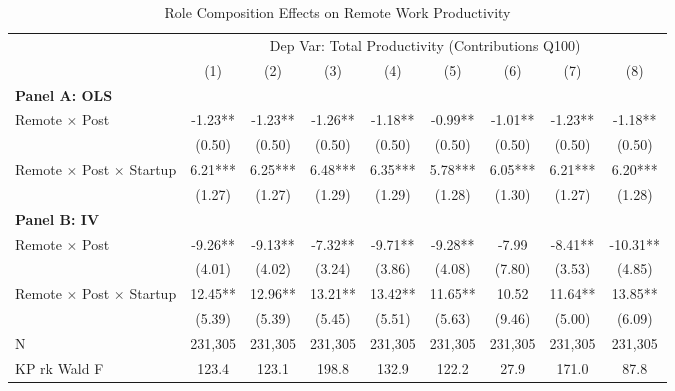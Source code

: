 \documentclass[11pt]{article}
\begin{document}
\begin{table}[H]
\centering
\caption{Role Composition Effects on Remote Work Productivity}
\label{tab:role_composition}
\begin{adjustbox}{width=\textwidth}
\begin{tabular}{l*{8}{c}}
\toprule
 & \multicolumn{8}{c}{Dep Var: Total Productivity (Contributions Q100)} \\
\cmidrule{2-9}
 & (1) & (2) & (3) & (4) & (5) & (6) & (7) & (8) \\
\midrule
\multicolumn{9}{l}{\textbf{Panel A: OLS}} \\
\addlinespace
Remote $\times$ Post & -1.23** & -1.23** & -1.26** & -1.18** & -0.99** & -1.01** & -1.23** & -1.18** \\
 & (0.50) & (0.50) & (0.50) & (0.50) & (0.50) & (0.50) & (0.50) & (0.50) \\
\addlinespace[0.5em]
Remote $\times$ Post $\times$ Startup & 6.21*** & 6.25*** & 6.48*** & 6.35*** & 5.78*** & 6.05*** & 6.21*** & 6.20*** \\
 & (1.27) & (1.27) & (1.29) & (1.29) & (1.28) & (1.30) & (1.27) & (1.28) \\

\midrule
\multicolumn{9}{l}{\textbf{Panel B: IV}} \\
\addlinespace
Remote $\times$ Post & -9.26** & -9.13** & -7.32** & -9.71** & -9.28** & -7.99 & -8.41** & -10.31** \\
 & (4.01) & (4.02) & (3.24) & (3.86) & (4.08) & (7.80) & (3.53) & (4.85) \\
\addlinespace[0.5em]
Remote $\times$ Post $\times$ Startup & 12.45** & 12.96** & 13.21** & 13.42** & 11.65** & 10.52 & 11.64** & 13.85** \\
 & (5.39) & (5.39) & (5.45) & (5.51) & (5.63) & (9.46) & (5.00) & (6.09) \\

\midrule
N & 231,305 & 231,305 & 231,305 & 231,305 & 231,305 & 231,305 & 231,305 & 231,305 \\
KP rk Wald F & 123.4 & 123.1 & 198.8 & 132.9 & 122.2 & 27.9 & 171.0 & 87.8 \\


\end{tabular}
\end{adjustbox}
\end{table}
\end{document}
